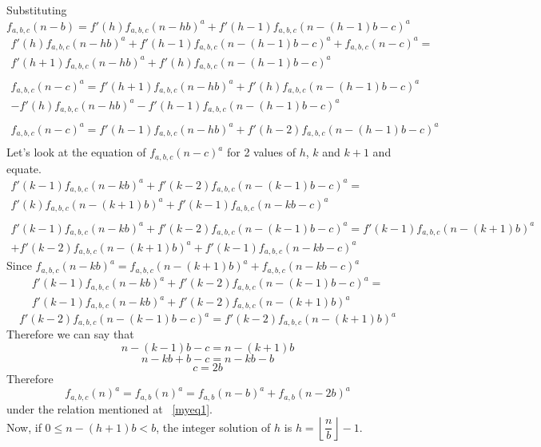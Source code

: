 \documentclass[preprint,12pt]{elsarticle}
\begin{document}
Substituting $f_{a,b,c}(n-b) = f'(h)f_{a,b,c}(n-hb)^a+f'(h-1)f_{a,b,c}(n-(h-1)b-c)^a$
\begin{multline*}
	f'(h)f_{a,b,c}(n-hb)^a+f'(h-1)f_{a,b,c}(n-(h-1)b-c)^a + f_{a,b,c}(n-c)^a =\\f'(h+1)f_{a,b,c}(n-hb)^a +f'(h)f_{a,b,c}(n-(h-1)b-c)^a\\\\
	f_{a,b,c}(n-c)^a = f'(h+1)f_{a,b,c}(n-hb)^a +f'(h)f_{a,b,c}(n-(h-1)b-c)^a \\-f'(h)f_{a,b,c}(n-hb)^a-f'(h-1)f_{a,b,c}(n-(h-1)b-c)^a\\\\
	f_{a,b,c}(n-c)^a = f'(h-1)f_{a,b,c}(n-hb)^a+f'(h-2)f_{a,b,c}(n-(h-1)b-c)^a\\
\end{multline*}
Let's look at the equation of $f_{a,b,c}(n-c)^a$ for 2 values of $h$, $k$ and $k+1$ and equate.
\begin{multline*}
	f'(k-1)f_{a,b,c}(n-kb)^a+f'(k-2)f_{a,b,c}(n-(k-1)b-c)^a =\\ f'(k)f_{a,b,c}(n-(k+1)b)^a+f'(k-1)f_{a,b,c}(n-kb-c)^a\\\\
	f'(k-1)f_{a,b,c}(n-kb)^a+f'(k-2)f_{a,b,c}(n-(k-1)b-c)^a =
	f'(k-1)f_{a,b,c}(n-(k+1)b)^a\\+f'(k-2)f_{a,b,c}(n-(k+1)b)^a +f'(k-1)f_{a,b,c}(n-kb-c)^a
\end{multline*}
Since $f_{a,b,c}(n-kb)^a = f_{a,b,c}(n-(k+1)b)^a+f_{a,b,c}(n-kb-c)^a$
\begin{multline*}
	f'(k-1)f_{a,b,c}(n-kb)^a+f'(k-2)f_{a,b,c}(n-(k-1)b-c)^a =\\ f'(k-1)f_{a,b,c}(n-kb)^a+f'(k-2)f_{a,b,c}(n-(k+1)b)^a
\end{multline*}
$$f'(k-2)f_{a,b,c}(n-(k-1)b-c)^a = f'(k-2)f_{a,b,c}(n-(k+1)b)^a$$
Therefore we can say that $$n-(k-1)b -c = n-(k+1)b$$
$$n-kb+b-c=n-kb-b$$
$$c = 2b$$
Therefore $$f_{a,b,c}(n)^a = f_{a,b}(n)^a = f_{a,b}(n-b)^a+f_{a,b}(n-2b)^a$$ under the relation mentioned at ~\eqref{myeq1}.\\
Now, if $0 \leq n-(h+1)b < b$, the integer solution of $h$ is $h = \left\lfloor\dfrac{n}{b}\right\rfloor - 1$.
\end{document}
